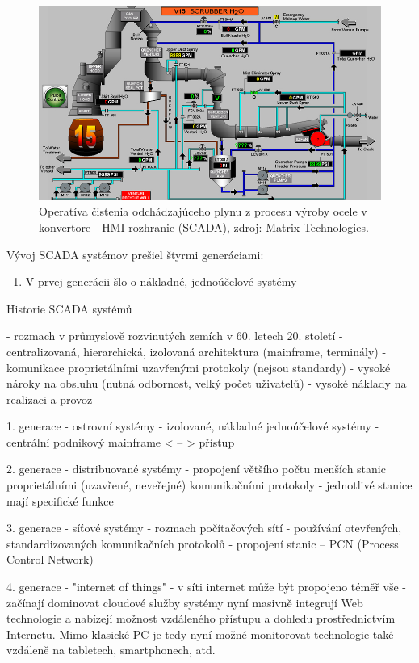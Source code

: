 \documentclass[]{tukediphc}
\begin{document}
\begin{figure}[h!]
	\centering
	\includegraphics[width=.9\textwidth,angle=0]{figures/bof-scada.jpg}
	\caption{Operatíva čistenia odchádzajúceho plynu z procesu výroby ocele v konvertore - HMI rozhranie (SCADA), zdroj: Matrix Technologies.}
\end{figure}

Vývoj SCADA systémov prešiel štyrmi generáciami:

\begin{enumerate}
	\item{V prvej generácii šlo o nákladné, jednoúčelové systémy}
\end{enumerate}



Historie SCADA systémů

- rozmach v průmyslově rozvinutých zemích v 60. letech 20. století
- centralizovaná, hierarchická, izolovaná architektura (mainframe, terminály)
- komunikace proprietálními uzavřenými protokoly (nejsou standardy)
- vysoké nároky na obsluhu (nutná odbornost, velký počet uživatelů)
- vysoké náklady na realizaci a provoz

1. generace - ostrovní systémy
- izolované, nákladné jednoúčelové systémy
- centrální podnikový mainframe < – > přístup

2. generace - distribuované systémy
- propojení většího počtu menších stanic proprietálními (uzavřené, neveřejné) komunikačními protokoly
- jednotlivé stanice mají specifické funkce

3. generace - síťové systémy
- rozmach počítačových sítí
- používání otevřených, standardizovaných komunikačních protokolů
- propojení stanic – PCN (Process Control Network)

4. generace - "internet of things"
- v síti internet může být propojeno téměř vše
- začínají dominovat cloudové služby
systémy nyní masivně integrují Web technologie a nabízejí možnost vzdáleného přístupu a dohledu prostřednictvím Internetu. Mimo klasické PC je tedy nyní možné monitorovat technologie také vzdáleně na tabletech, smartphonech, atd.
\end{document}
